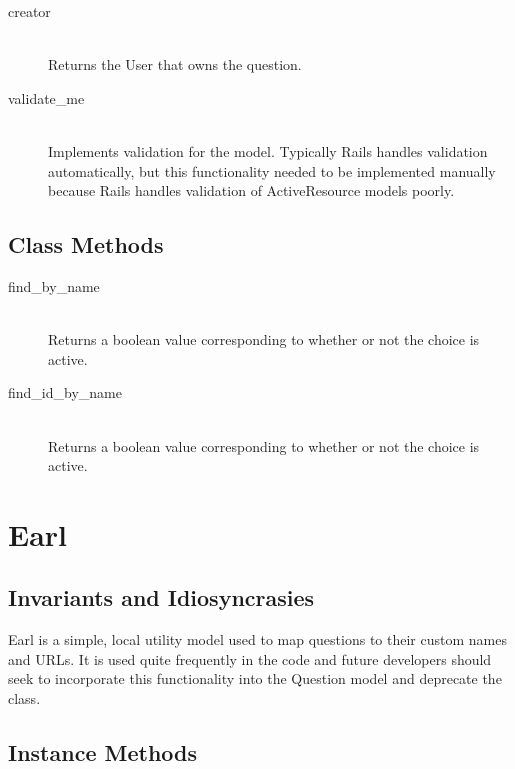 \documentclass[11pt]{book}
\begin{document}
\begin{description}
  \item[creator]  \hfill \\
  \emph{} Returns the User that owns the question.
  
  \item[validate\_me]  \hfill \\
  \emph{} Implements validation for the model.  Typically Rails handles validation automatically, but this functionality needed to be implemented manually because Rails handles validation of ActiveResource models poorly.
  
  
\end{description}


\subsection{Class Methods}

\begin{description}

\item[find\_by\_name]  \hfill \\
\emph{} Returns a boolean value corresponding to whether or not the choice is active.

\item[find\_id\_by\_name]  \hfill \\
\emph{} Returns a boolean value corresponding to whether or not the choice is active.

\end{description}

\section{Earl}

\subsection{Invariants and Idiosyncrasies}

Earl is a simple, local utility model used to map questions to their custom names and URLs.  It is used quite frequently in the code and future developers should seek to incorporate this functionality into the Question model and deprecate the class.

\subsection{Instance Methods}
\end{document}
